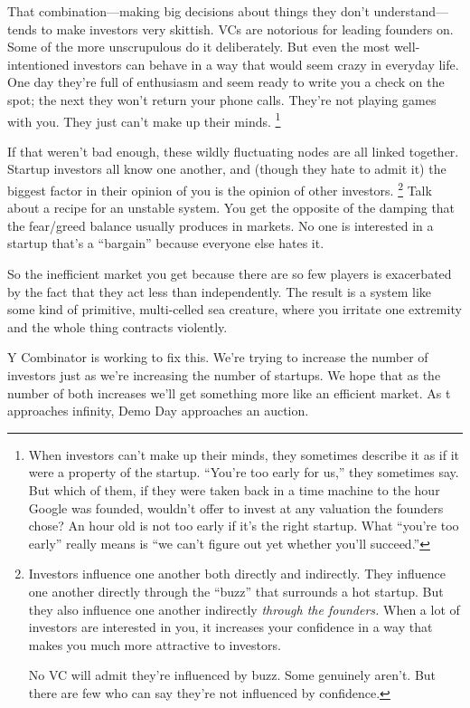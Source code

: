 \documentclass[12pt]{book}
\begin{document}
That combination---making big decisions about things they don't
understand---tends to make investors very skittish. VCs are notorious
for leading founders on. Some of the more unscrupulous do it
deliberately. But even the most well-intentioned investors can behave in
a way that would seem crazy in everyday life. One day they're full of
enthusiasm and seem ready to write you a check on the spot; the next
they won't return your phone calls. They're not playing games with you.
They just can't make up their minds. \footnote{When investors can't make up their minds, they sometimes
describe it as if it were a property of the startup. ``You're too early
for us,'' they sometimes say. But which of them, if they were taken back
in a time machine to the hour Google was founded, wouldn't offer to
invest at any valuation the founders chose? An hour old is not too early
if it's the right startup. What ``you're too early'' really means is
``we can't figure out yet whether you'll succeed.''}

If that weren't bad enough, these wildly fluctuating nodes are all
linked together. Startup investors all know one another, and (though
they hate to admit it) the biggest factor in their opinion of you is the
opinion of other investors. \footnote{Investors influence one another both directly and indirectly.
They influence one another directly through the ``buzz'' that surrounds
a hot startup. But they also influence one another indirectly
\emph{through the founders.} When a lot of investors are interested in
you, it increases your confidence in a way that makes you much more
attractive to investors.

No VC will admit they're influenced by buzz. Some genuinely aren't. But
there are few who can say they're not influenced by confidence.} Talk about a recipe
for an unstable system. You get the opposite of the damping that the
fear/greed balance usually produces in markets. No one is interested in
a startup that's a ``bargain'' because everyone else hates it.

So the inefficient market you get because there are so few players is
exacerbated by the fact that they act less than independently. The
result is a system like some kind of primitive, multi-celled sea
creature, where you irritate one extremity and the whole thing contracts
violently.

Y Combinator is working to fix this. We're trying to increase the number
of investors just as we're increasing the number of startups. We hope
that as the number of both increases we'll get something more like an
efficient market. As t approaches infinity, Demo Day approaches an
auction.
\end{document}
